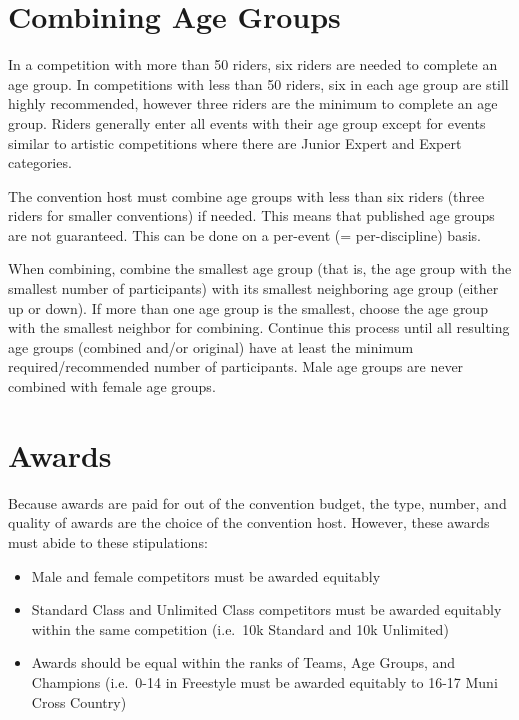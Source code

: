 \section{Combining Age Groups \label{subsec:general_host's-option-unicon_combining-age-groups}}

In a competition with more than 50 riders, six riders are needed to complete an age group.
In competitions with less than 50 riders, six in each age group are still highly recommended, however three riders are the minimum to complete an age group.
Riders generally enter all events with their age group except for events similar to artistic competitions where there are Junior Expert and Expert categories.

The convention host must combine age groups with less than six riders (three riders for smaller conventions) if needed.
This means that published age groups are not guaranteed.
This can be done on a per-event (= per-discipline) basis.

When combining, combine the smallest age group (that is, the age group with the smallest number of participants) with its smallest neighboring age group (either up or down).
If more than one age group is the smallest, choose the age group with the smallest neighbor for combining.
Continue this process until all resulting age groups (combined and/or original) have at least the minimum required/recommended number of participants.
Male age groups are never combined with female age groups.

\section{Awards}

Because awards are paid for out of the convention budget, the type, number, and quality of awards are the choice of the convention host.
However, these awards must abide to these stipulations:
\begin{itemize}
\item Male and female competitors must be awarded equitably
\item Standard Class and Unlimited Class competitors must be awarded equitably within the same competition (i.e.\ 10k Standard and 10k Unlimited)
\item Awards should be equal within the ranks of Teams, Age Groups, and Champions (i.e.\ 0-14 in Freestyle must be awarded equitably to 16-17 Muni Cross Country)
\end{itemize}

